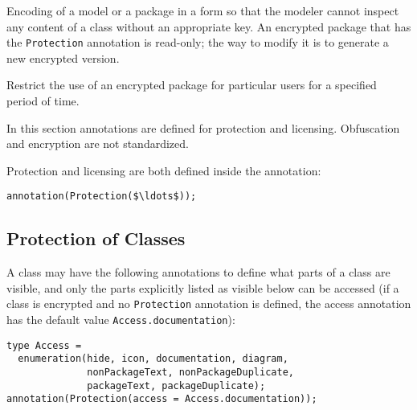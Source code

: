 \begin{definition}[Encryption]
Encoding of a model or a package in a form so that the modeler cannot inspect any content of a class without an appropriate key.
An encrypted package that has the \lstinline!Protection! annotation is read-only; the way to modify it is to generate a new encrypted version.
\end{definition}

\begin{definition}[Licensing]
Restrict the use of an encrypted package for particular users for a specified period of time.
\end{definition}

In this section annotations are defined for protection and licensing.
Obfuscation and encryption are not standardized.

Protection and licensing are both defined inside the  annotation:
\begin{lstlisting}[language=modelica]
annotation(Protection($\ldots$));
\end{lstlisting}

\subsection{Protection of Classes}\label{protection-of-classes}

A class may have the following annotations to define what parts of a class are visible, and only the parts explicitly listed as visible below can be accessed (if a class is encrypted and no \lstinline!Protection! annotation is defined, the access annotation has the default value \lstinline!Access.documentation!):
\begin{lstlisting}[language=modelica]
type Access =
  enumeration(hide, icon, documentation, diagram,
              nonPackageText, nonPackageDuplicate,
              packageText, packageDuplicate);
annotation(Protection(access = Access.documentation));
\end{lstlisting}

